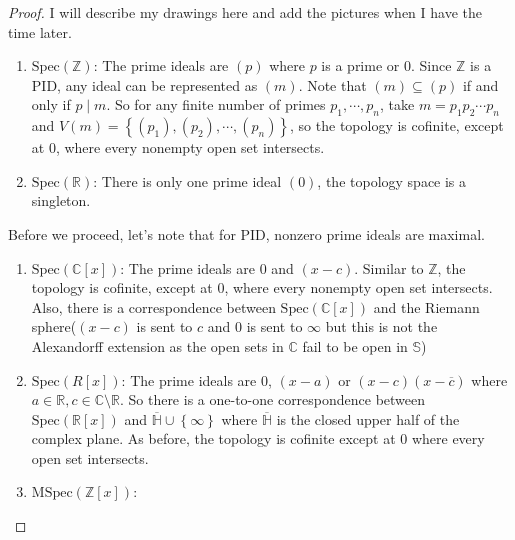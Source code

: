 \documentclass{solution}
\begin{document}
\begin{proof}
    I will describe my drawings here and add the pictures when I have the time later.

    \begin{enumerate}
        \item $\mathrm{Spec}(\mathbb{Z})$: The prime ideals are $(p)$ where $p$ is a prime or $0$. Since $\mathbb{Z}$ is a PID, any ideal can be represented as $(m)$. Note that $(m) \subseteq (p)$ if and only if $p \mid m$. So for any finite number of primes $p_1, \cdots, p_n$, take $m = p_1p_2\cdots p_n$ and $V(m) = \left\lbrace (p_1), (p_2), \cdots, (p_n) \right\rbrace$, so the topology is cofinite, except at $0$, where every nonempty open set intersects.
        \item $\mathrm{Spec}(\mathbb{R})$: There is only one prime ideal $(0)$, the topology space is a singleton.
    \end{enumerate}

    Before we proceed, let's note that for PID, nonzero prime ideals are maximal.

    \begin{enumerate}
        \item $\mathrm{Spec}(\mathbb{C}[x])$: The prime ideals are $0$ and $(x - c)$. Similar to $\mathbb{Z}$, the topology is cofinite, except at $0$, where every nonempty open set intersects. Also, there is a correspondence between $\mathrm{Spec}(\mathbb{C}[x])$ and the Riemann sphere($(x - c)$ is sent to $c$ and $0$ is sent to $\infty$ {\color{red} but this is not the Alexandorff extension as the open sets in $\mathbb{C}$ fail to be open in $\mathbb{S}$})
        \item $\mathrm{Spec}(R[x])$: The prime ideals are $0$, $(x - a)$ or $(x - c)(x - \overline{c})$ where $a \in \mathbb{R}, c \in \mathbb{C} \setminus \mathbb{R}$. So there is a one-to-one correspondence between $\mathrm{Spec}(\mathbb{R}[x])$ and $\overline{\mathbb{H}} \cup \left\lbrace \infty \right\rbrace$ where $\overline{\mathbb{H}}$ is the closed upper half of the complex plane. As before, the topology is cofinite except at $0$ where every open set intersects.
        \item $\mathrm{MSpec}(\mathbb{Z}[x])$: \TODO
    \end{enumerate}

\end{proof}
\end{document}
